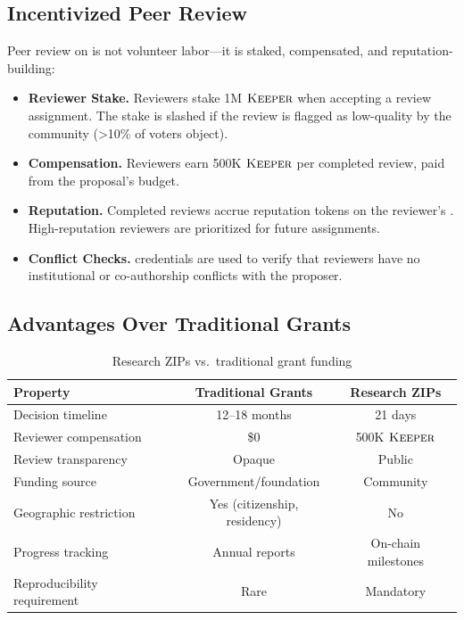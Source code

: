 \subsection{Incentivized Peer Review}

Peer review on \Zoo{} is not volunteer labor---it is staked, compensated, and reputation-building:

\begin{itemize}
    \item \textbf{Reviewer Stake.} Reviewers stake 1M $\textsc{Keeper}$ when accepting a review assignment. The stake is slashed if the review is flagged as low-quality by the community (>10\% of voters object).
    \item \textbf{Compensation.} Reviewers earn 500K $\textsc{Keeper}$ per completed review, paid from the proposal's budget.
    \item \textbf{Reputation.} Completed reviews accrue reputation tokens on the reviewer's \DID{}. High-reputation reviewers are prioritized for future assignments.
    \item \textbf{Conflict Checks.} \IChain{} \DID{} credentials are used to verify that reviewers have no institutional or co-authorship conflicts with the proposer.
\end{itemize}

\subsection{Advantages Over Traditional Grants}

\begin{table}[h]
\centering
\begin{tabular}{lcc}
\toprule
\textbf{Property} & \textbf{Traditional Grants} & \textbf{Research ZIPs} \\
\midrule
Decision timeline & 12--18 months & 21 days \\
Reviewer compensation & \$0 & 500K $\textsc{Keeper}$ \\
Review transparency & Opaque & Public \\
Funding source & Government/foundation & Community \DAO{} \\
Geographic restriction & Yes (citizenship, residency) & No \\
Progress tracking & Annual reports & On-chain milestones \\
Reproducibility requirement & Rare & Mandatory \\
\bottomrule
\end{tabular}
\caption{Research ZIPs vs.\ traditional grant funding}
\label{tab:grants_comparison}
\end{table}

